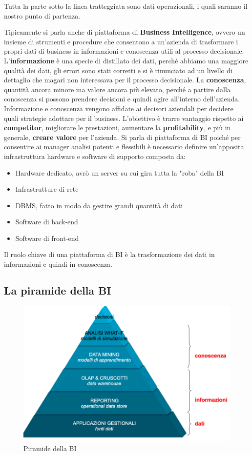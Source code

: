 Tutta la parte sotto la linea tratteggiata sono dati operazionali, i quali saranno il nostro punto di partenza.

Tipicamente si parla anche di piattaforma di \textbf{Business Intelligence}, ovvero un insieme di strumenti e procedure che consentono a un’azienda di trasformare i propri dati di business in informazioni e conoscenza utili al processo decisionale. L'\textbf{informazione} è una specie di distillato dei dati, perché abbiamo una maggiore qualità dei dati, gli errori sono stati corretti e  si è rinunciato ad un livello di dettaglio che magari non interessava per il processo decisionale. La \textbf{conoscenza}, quantità ancora minore ma valore ancora più elevato, perché a partire dalla conoscenza si possono prendere decisioni e quindi agire all’interno dell’azienda. Informazione e conoscenza vengono affidate ai decisori aziendali per decidere quali strategie adottare per il business. L’obiettivo è trarre vantaggio rispetto ai \textbf{competitor}, migliorare le prestazioni, aumentare la \textbf{profitability}, e più in generale, \textbf{creare valore} per l’azienda.
Si parla di piattaforma di BI poiché per consentire ai manager analisi potenti e flessibili è necessario definire un’apposita infrastruttura hardware e software di supporto composta da:
\begin{itemize}
	\item 
	Hardware dedicato, avrò un server su cui gira tutta la "roba" della BI
	\item 
	Infrastrutture di rete
	\item 
	DBMS, fatto in modo da gestire grandi quantità di dati
	\item 
	Software di back-end
	\item 
	Software di front-end
\end{itemize}
Il ruolo chiave di una piattaforma di BI è la trasformazione dei dati in informazioni e quindi in conoscenza.

\subsection{La piramide della BI}

\begin{figure}[H]	
	\centering
	\includegraphics[width=0.7\linewidth]{img/piramide}
	\caption{Piramide della BI}
	\label{fig:piramide}
\end{figure}

